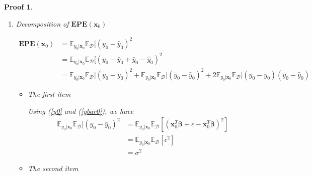 \documentclass[a4paper,UTF8]{article}
\numberwithin{equation}{section}
\newtheorem*{myProof}{Proof}
\begin{document}
\begin{myProof}
\begin{enumerate}[Step 1.]
\begin{itemize}
\end{itemize}

\item Decomposition of $\mathbf{EPE}(\textbf{x}_0)$ 

\begin{equation}\label{EPE}
\begin{split}
\mathbf{EPE}(\textbf{x}_0)&=\mathbb{E}_{y_0|\textbf{x}_0} \mathbb{E}_{\mathcal{D}}[(y_0-\hat{y}_0)^2  \\
&=\mathbb{E}_{y_0|\textbf{x}_0} \mathbb{E}_{\mathcal{D}}[(y_0-\bar{y}_0 + \bar{y}_0- \hat{y}_0)^2  \\
&= \mathbb{E}_{y_0|\textbf{x}_0} \mathbb{E}_{\mathcal{D}}[(y_0-\bar{y}_0)^2 + \mathbb{E}_{y_0|\textbf{x}_0} \mathbb{E}_{\mathcal{D}}[(\bar{y}_0-\hat{y}_0)^2 + 2 \mathbb{E}_{y_0|\textbf{x}_0} \mathbb{E}_{\mathcal{D}}[(y_0-\bar{y}_0)(\bar{y}_0 - \hat{y}_0)
\end{split}
\end{equation}

\begin{itemize}
\item The first item

Using (\ref{y0} and (\ref{ybar0}), we have 
\begin{equation}\label{first-item}
\begin{split}
\mathbb{E}_{y_0|\textbf{x}_0} \mathbb{E}_{\mathcal{D}}[(y_0-\bar{y}_0)^2 &= \mathbb{E}_{y_0|\textbf{x}_0} \mathbb{E}_{\mathcal{D}}[(\textbf{x}_0^T \bm{\beta} + \epsilon - \textbf{x}_0^T \bm{\beta})^2]\\
&= \mathbb{E}_{y_0|\textbf{x}_0} \mathbb{E}_{\mathcal{D}} [\epsilon ^2]\\
&=\sigma ^2
\end{split}
\end{equation}

\item The second item


\end{itemize}
\end{enumerate}
\end{myProof}
\end{document}
